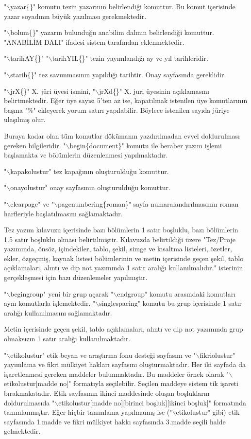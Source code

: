 "$\backslash$yazar\{\}" komutu tezin yazarının belirlendiği komuttur. Bu komut içerisinde yazar soyadının büyük yazılması gerekmektedir.

"$\backslash$bolum\{\}" yazarın bulunduğu anabilim dalının belirlendiği komuttur. "ANABİLİM DALI" ifadesi sistem tarafından eklenmektedir. 

"$\backslash$tarihAY\{\}" "$\backslash$tarihYIL\{\}" tezin yayımlandığı ay ve yıl tarihleridir.

"$\backslash$starih\{\}" tez savunmasının yapıldığı tarihtir. Onay sayfasında gereklidir. 

"$\backslash$jrX\{\}" X. jüri üyesi ismini, "$\backslash$jrXd\{\}" X. juri üyesinin açıklamasını belirtmektedir. Eğer üye sayısı 5'ten az ise, kapatılmak istenilen üye komutlarının başına "\%" ekleyerek yorum satırı yapılabilir. Böylece istenilen sayıda jüriye ulaşılmış olur. 

Buraya kadar olan tüm komutlar dökümanın yazdırılmadan evvel doldurulması gereken bilgileridir. "$\backslash$begin\{document\}" komutu ile beraber yazım işlemi başlamakta ve bölümlerin düzenlenmesi yapılmaktadır. 

"$\backslash$kapakolustur" tez kapağının oluşturulduğu komuttur. 

"$\backslash$onayolustur" onay sayfasının oluşturulduğu komuttur. 

"$\backslash$clearpage" ve "$\backslash$pagenumbering\{roman\}" sayfa numaralandırılmasının roman harfleriyle başlatılmasını sağlamaktadır. 

Tez yazım kılavuzu içerisinde bazı bölümlerin 1 satır boşluklu, bazı bölümlerin 1.5 satır boşluklu olması belirtilmiştir. Kılavuzda belirtildiği üzere "Tez/Proje yazımında, önsöz, içindekiler, tablo, şekil, simge ve kısaltma listeleri, özetler, ekler, özgeçmiş, kaynak listesi bölümlerinin ve metin içerisinde geçen şekil, tablo açıklamaları, alıntı ve dip not yazımında 1 satır aralığı kullanılmalıdır." isterinin gerçekleşmesi için bazı düzenlemeler yapılmıştır. 

"$\backslash$begingroup" yeni bir grup açarak "$\backslash$endgroup" komutu arasındaki komutları aynı komutlarla işlemektedir. "$\backslash$singlespacing" komutu bu grup içerisinde 1 satır aralığı kullanılmasını sağlamaktadır. 

Metin içerisinde geçen şekil, tablo açıklamaları, alıntı ve dip not yazımında grup olmaksızın 1 satır aralığı kullanılmaktadır. 

"$\backslash$etikolustur" etik beyan ve araştırma fonu desteği sayfasını ve "$\backslash$fikriolustur" yayımlama ve fikri mülkiyet hakları sayfasını oluşturmaktadır. Her iki sayfada da işaretlenmesi gereken maddeler bulunmaktadır. Bu maddeler örnek olarak "$\backslash$etikolustur[madde no]" formatıyla seçilebilir. Seçilen maddeye sistem tik işareti bırakmakatadır. Etik sayfasının ikinci maddesinde oluşan boşlukların doldurulmasıda "$\backslash$etikolustur[madde no][birinci boşluk][ikinci boşluk]" formatında tanımlanmıştır. Eğer hiçbir tanımlama yapılmamış ise ("$\backslash$etikolustur" gibi) etik sayfasında 1.madde ve fikri mülkiyet hakkı sayfasında 3.madde seçili halde gelmektedir.

